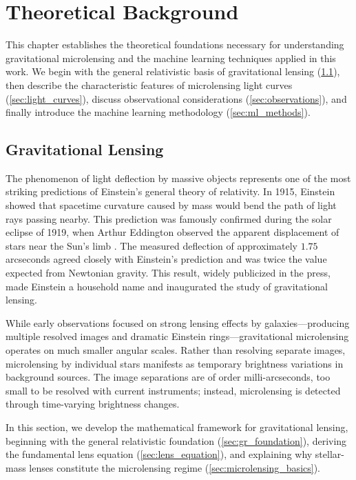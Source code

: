 \chapter{Theoretical Background}
\label{chap:theory}

This chapter establishes the theoretical foundations necessary for understanding gravitational microlensing and the machine learning techniques applied in this work. We begin with the general relativistic basis of gravitational lensing (\cref{sec:grav_lensing}), then describe the characteristic features of microlensing light curves (\cref{sec:light_curves}), discuss observational considerations (\cref{sec:observations}), and finally introduce the machine learning methodology (\cref{sec:ml_methods}).

\section{Gravitational Lensing}
\label{sec:grav_lensing}

The phenomenon of light deflection by massive objects represents one of the most striking predictions of Einstein's general theory of relativity. In 1915, Einstein showed that spacetime curvature caused by mass would bend the path of light rays passing nearby. This prediction was famously confirmed during the solar eclipse of 1919, when Arthur Eddington observed the apparent displacement of stars near the Sun's limb \citep{Dyson1920}. The measured deflection of approximately $1.75$ arcseconds agreed closely with Einstein's prediction and was twice the value expected from Newtonian gravity. This result, widely publicized in the press, made Einstein a household name and inaugurated the study of gravitational lensing.

While early observations focused on strong lensing effects by galaxies—producing multiple resolved images and dramatic Einstein rings—gravitational microlensing operates on much smaller angular scales. Rather than resolving separate images, microlensing by individual stars manifests as temporary brightness variations in background sources. The image separations are of order milli-arcseconds, too small to be resolved with current instruments; instead, microlensing is detected through time-varying brightness changes.

In this section, we develop the mathematical framework for gravitational lensing, beginning with the general relativistic foundation (\cref{sec:gr_foundation}), deriving the fundamental lens equation (\cref{sec:lens_equation}), and explaining why stellar-mass lenses constitute the microlensing regime (\cref{sec:microlensing_basics}).


